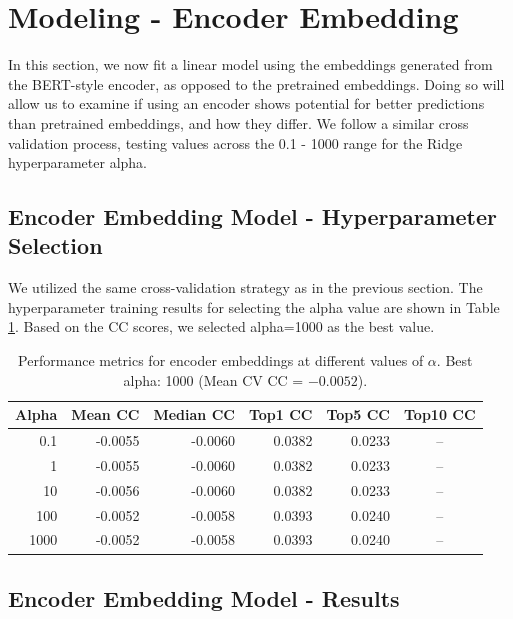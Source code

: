 \documentclass[10pt,letterpaper]{article}
\begin{document}
\section{Modeling - Encoder Embedding}

In this section, we now fit a linear model using the embeddings generated from the BERT-style encoder, as opposed to the pretrained embeddings. Doing so will allow us to examine if using an encoder shows potential for better predictions than pretrained embeddings, and how they differ. We follow a similar cross validation process, testing values across the 0.1 - 1000 range for the Ridge hyperparameter alpha.

\subsection{Encoder Embedding Model - Hyperparameter Selection}
We utilized the same cross-validation strategy as in the previous section. The hyperparameter training results for selecting the alpha value are shown in Table \ref{tab:encoder_cv}. Based on the CC scores, we selected alpha=1000 as the best value.

\begin{table}[ht]
\centering
\caption{Performance metrics for encoder embeddings at different values of $\alpha$. Best alpha: 1000 (Mean CV CC = $-0.0052$).}
\label{tab:encoder_cv}
\begin{tabular}{rrrrrr}
\toprule
\textbf{Alpha} & \textbf{Mean CC} & \textbf{Median CC} & \textbf{Top1 CC} & \textbf{Top5 CC} & \textbf{Top10 CC} \\
\midrule
0.1   & -0.0055 & -0.0060 & 0.0382 & 0.0233 & \multicolumn{1}{c}{--} \\
1     & -0.0055 & -0.0060 & 0.0382 & 0.0233 & \multicolumn{1}{c}{--} \\
10    & -0.0056 & -0.0060 & 0.0382 & 0.0233 & \multicolumn{1}{c}{--} \\
100   & -0.0052 & -0.0058 & 0.0393 & 0.0240 & \multicolumn{1}{c}{--} \\
1000  & -0.0052 & -0.0058 & 0.0393 & 0.0240 & \multicolumn{1}{c}{--} \\
\bottomrule
\end{tabular}
\end{table}

\subsection{Encoder Embedding Model - Results}
\end{document}
